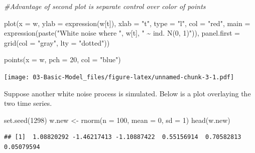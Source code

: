 \documentclass[
]{book}
\newenvironment{Shaded}{\begin{snugshade}}{\end{snugshade}}
\newcommand{\AttributeTok}[1]{\textcolor[rgb]{0.77,0.63,0.00}{#1}}
\newcommand{\CommentTok}[1]{\textcolor[rgb]{0.56,0.35,0.01}{\textit{#1}}}
\newcommand{\DecValTok}[1]{\textcolor[rgb]{0.00,0.00,0.81}{#1}}
\newcommand{\FunctionTok}[1]{\textcolor[rgb]{0.00,0.00,0.00}{#1}}
\newcommand{\NormalTok}[1]{#1}
\newcommand{\OtherTok}[1]{\textcolor[rgb]{0.56,0.35,0.01}{#1}}
\newcommand{\StringTok}[1]{\textcolor[rgb]{0.31,0.60,0.02}{#1}}
\theoremstyle{definition}
\theoremstyle{definition}
\theoremstyle{definition}
\theoremstyle{definition}
\theoremstyle{remark}
\begin{document}
\begin{Shaded}
\begin{Highlighting}[]
\CommentTok{\#Advantage of second plot is separate control over color of points}

\FunctionTok{plot}\NormalTok{(}\AttributeTok{x =}\NormalTok{ w, }\AttributeTok{ylab =} \FunctionTok{expression}\NormalTok{(w[t]), }\AttributeTok{xlab =} \StringTok{"t"}\NormalTok{, }\AttributeTok{type =} 
    \StringTok{"l"}\NormalTok{, }\AttributeTok{col =} \StringTok{"red"}\NormalTok{, }\AttributeTok{main =} \FunctionTok{expression}\NormalTok{(}\FunctionTok{paste}\NormalTok{(}\StringTok{"White noise where "}\NormalTok{, w[t], }\StringTok{" \textasciitilde{} ind. N(0, 1)"}\NormalTok{)), }
    \AttributeTok{panel.first =} \FunctionTok{grid}\NormalTok{(}\AttributeTok{col =} \StringTok{"gray"}\NormalTok{, }\AttributeTok{lty =} \StringTok{"dotted"}\NormalTok{))}

\FunctionTok{points}\NormalTok{(}\AttributeTok{x =}\NormalTok{ w, }\AttributeTok{pch =} \DecValTok{20}\NormalTok{, }\AttributeTok{col =} \StringTok{"blue"}\NormalTok{)}
\end{Highlighting}
\end{Shaded}

\texttt{[image: 03-Basic-Model\_files/figure-latex/unnamed-chunk-3-1.pdf]}

Suppose another white noise process is simulated. Below is a plot overlaying the two time series.

\begin{Shaded}
\begin{Highlighting}[]
\FunctionTok{set.seed}\NormalTok{(}\DecValTok{1298}\NormalTok{)}
\NormalTok{w.new }\OtherTok{\textless{}{-}} \FunctionTok{rnorm}\NormalTok{(}\AttributeTok{n =} \DecValTok{100}\NormalTok{, }\AttributeTok{mean =} \DecValTok{0}\NormalTok{, }\AttributeTok{sd =} \DecValTok{1}\NormalTok{)}
\FunctionTok{head}\NormalTok{(w.new)}
\end{Highlighting}
\end{Shaded}

\begin{verbatim}
## [1]  1.08820292 -1.46217413 -1.10887422  0.55156914  0.70582813  0.05079594
\end{verbatim}
\end{document}
